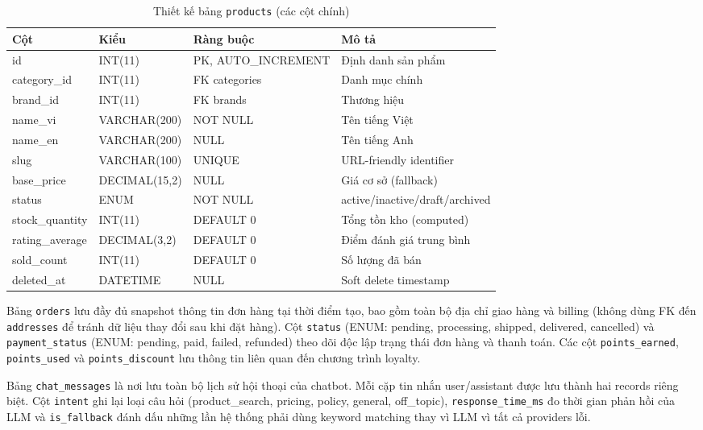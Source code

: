 \begin{table}[H]
\centering
\caption{Thiết kế bảng \texttt{products} (các cột chính)}
\begin{tabular}{|l|l|l|p{5cm}|}
\hline
\textbf{Cột} & \textbf{Kiểu} & \textbf{Ràng buộc} & \textbf{Mô tả} \\
\hline
id & INT(11) & PK, AUTO\_INCREMENT & Định danh sản phẩm \\
\hline
category\_id & INT(11) & FK categories & Danh mục chính \\
\hline
brand\_id & INT(11) & FK brands & Thương hiệu \\
\hline
name\_vi & VARCHAR(200) & NOT NULL & Tên tiếng Việt \\
\hline
name\_en & VARCHAR(200) & NULL & Tên tiếng Anh \\
\hline
slug & VARCHAR(100) & UNIQUE & URL-friendly identifier \\
\hline
base\_price & DECIMAL(15,2) & NULL & Giá cơ sở (fallback) \\
\hline
status & ENUM & NOT NULL & active/inactive/draft/archived \\
\hline
stock\_quantity & INT(11) & DEFAULT 0 & Tổng tồn kho (computed) \\
\hline
rating\_average & DECIMAL(3,2) & DEFAULT 0 & Điểm đánh giá trung bình \\
\hline
sold\_count & INT(11) & DEFAULT 0 & Số lượng đã bán \\
\hline
deleted\_at & DATETIME & NULL & Soft delete timestamp \\
\hline
\end{tabular}
\end{table}

Bảng \texttt{orders} lưu đầy đủ snapshot thông tin đơn hàng tại thời điểm tạo, bao gồm toàn bộ địa chỉ giao hàng và billing (không dùng FK đến \texttt{addresses} để tránh dữ liệu thay đổi sau khi đặt hàng). Cột \texttt{status} (ENUM: pending, processing, shipped, delivered, cancelled) và \texttt{payment\_status} (ENUM: pending, paid, failed, refunded) theo dõi độc lập trạng thái đơn hàng và thanh toán. Các cột \texttt{points\_earned}, \texttt{points\_used} và \texttt{points\_discount} lưu thông tin liên quan đến chương trình loyalty.

Bảng \texttt{chat\_messages} là nơi lưu toàn bộ lịch sử hội thoại của chatbot. Mỗi cặp tin nhắn user/assistant được lưu thành hai records riêng biệt. Cột \texttt{intent} ghi lại loại câu hỏi (product\_search, pricing, policy, general, off\_topic), \texttt{response\_time\_ms} đo thời gian phản hồi của LLM và \texttt{is\_fallback} đánh dấu những lần hệ thống phải dùng keyword matching thay vì LLM vì tất cả providers lỗi.

